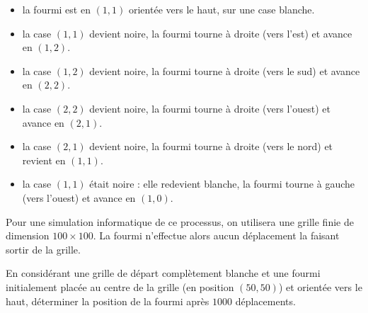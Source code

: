 \documentclass[11pt,a4paper]{article}
\begin{document}
\begin{itemize}[leftmargin=1.5cm]
 \item[\footnotesize $t=0$ :] la fourmi est en $(1, 1)$ orientée vers le haut, sur une case blanche.
 \item[\footnotesize $t=1$ :] la case $(1, 1)$ devient noire, la fourmi tourne à droite (vers l'est) et avance en $(1, 2)$.
 \item[\footnotesize $t=2$ :] la case $(1, 2)$ devient noire, la fourmi tourne à droite (vers le sud) et avance en $(2, 2)$.
 \item[\footnotesize $t=3$ :] la case $(2, 2)$ devient noire, la fourmi tourne à droite (vers l'ouest) et avance en $(2, 1)$.
 \item[\footnotesize $t=4$ :] la case $(2, 1)$ devient noire, la fourmi tourne à droite (vers le nord) et revient en $(1, 1)$.
 \item[\footnotesize $t=5$ :] la case $(1, 1)$ était noire : elle redevient blanche, la fourmi tourne à gauche (vers l'ouest) et avance en $(1, 0)$.
\end{itemize}

\vspace{0.2cm}
Pour une simulation informatique de ce processus, on utilisera une grille finie de dimension $100 \times 100$. La fourmi n'effectue alors aucun déplacement la faisant sortir de la grille.

\begin{tcolorbox}[left=0cm,title=\textbf{\faQuestion{} Fourmi de Langton},colbacktitle=cfond]
    En considérant une grille de départ complètement blanche et une fourmi initialement placée au centre de la grille (en position $(50, 50)$) et orientée vers le haut, déterminer la position de la fourmi après $1000$ déplacements.
\end{tcolorbox}
\end{document}
